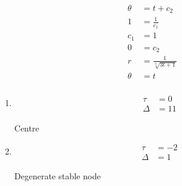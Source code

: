 \documentclass{article}
\begin{document}
\begin{align*}
  \theta                     & = t + c_2                                                             \\
  1                          & = \frac{1}{c_1}                                                       \\
  c_1                        & = 1                                                                   \\
  0                          & = c_2                                                                 \\
  r                          & = \frac{1}{\sqrt[3]{3 t + 1}}                                         \\
  \theta                     & = t
\end{align*}

\setcounter{subsubsection}{12}
\subsubsection{}

\begin{enumerate}
  \item

        \begin{align*}
          \tau   & = 0  \\
          \Delta & = 11
        \end{align*}

        Centre

  \item

        \begin{align*}
          \tau   & = -2 \\
          \Delta & = 1
        \end{align*}

        Degenerate stable node
\end{enumerate}

\setcounter{subsubsection}{14}
\subsubsection{}
\end{document}
